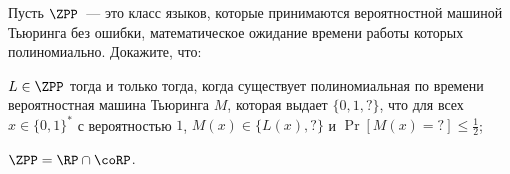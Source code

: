 Пусть $\ZPP$~--- это класс языков, которые принимаются вероятностной машиной Тьюринга без ошибки,
математическое ожидание времени работы которых полиномиально. Докажите, что:
\begin{enumcyr}
    \item $L \in \ZPP$ тогда и только тогда, когда существует полиномиальная по времени вероятностная
        машина Тьюринга $M$, которая выдает $\{0, 1, ?\}$, что для всех $x \in \{0, 1\}^*$ с вероятностью
        $1$, $M(x) \in \{L(x), ?\}$ и $\Pr[M(x) = {?}] \le \frac{1}{2}$;
    \item $\ZPP = \RP \cap \coRP$.
\end{enumcyr}
